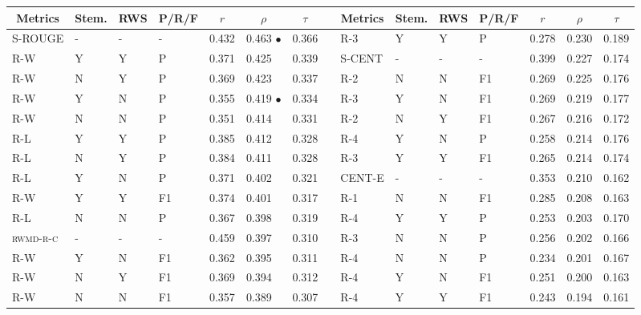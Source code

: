 \documentclass[11pt,a4paper]{article}
\begin{document}
\begin{table}[]
{
\scriptsize
\centering
\begin{tabular}{lllllllllllllll}
\hline
\multicolumn{1}{c}{Metrics} & \multicolumn{1}{c}{Stem.} & \multicolumn{1}{c}{RWS} & \multicolumn{1}{c}{P/R/F} & \multicolumn{1}{c}{$r$} & \multicolumn{1}{c}{$\rho$} & \multicolumn{1}{c}{$\tau$} & \multicolumn{1}{c}{} & \multicolumn{1}{c}{Metrics} & \multicolumn{1}{c}{Stem.} & \multicolumn{1}{c}{RWS} & \multicolumn{1}{c}{P/R/F} & \multicolumn{1}{c}{$r$} & \multicolumn{1}{c}{$\rho$} & \multicolumn{1}{c}{$\tau$} \\ \hline
\textsc{S-ROUGE} & - & - & - & 0.432 & 0.463 $\bullet$ & 0.366 &  & \textsc{R-3} & Y & Y & P & 0.278 & 0.230 & 0.189 \\
\textsc{R-W} & Y & Y & P & 0.371 & 0.425 & 0.339 &  & \textsc{S-CENT} & - & - & - & 0.399 & 0.227 & 0.174 \\
\textsc{R-W} & N & Y & P & 0.369 & 0.423 & 0.337 &  & \textsc{R-2} & N & N & F1 & 0.269 & 0.225 & 0.176 \\
\textsc{R-W} & Y & N & P & 0.355 & 0.419 $\bullet$ & 0.334 &  & \textsc{R-3} & Y & N & F1 & 0.269 & 0.219 & 0.177 \\
\textsc{R-W} & N & N & P & 0.351 & 0.414 & 0.331 &  & \textsc{R-2} & N & Y & F1 & 0.267 & 0.216 & 0.172 \\
\textsc{R-L} & Y & Y & P & 0.385 & 0.412 & 0.328 &  & \textsc{R-4} & Y & N & P & 0.258 & 0.214 & 0.176 \\
\textsc{R-L} & N & Y & P & 0.384 & 0.411 & 0.328 &  & \textsc{R-3} & Y & Y & F1 & 0.265 & 0.214 & 0.174 \\
\textsc{R-L} & Y & N & P & 0.371 & 0.402 & 0.321 &  & \textsc{CENT-E} & - & - & - & 0.353 & 0.210 & 0.162 \\
\textsc{R-W} & Y & Y & F1 & 0.374 & 0.401 & 0.317 &  & \textsc{R-1} & N & N & F1 & 0.285 & 0.208 & 0.163 \\
\textsc{R-L} & N & N & P & 0.367 & 0.398 & 0.319 &  & \textsc{R-4} & Y & Y & P & 0.253 & 0.203 & 0.170 \\
\textsc{rwmd-r-c} & - & - & - & 0.459 & 0.397 & 0.310 &  & \textsc{R-3} & N & N & P & 0.256 & 0.202 & 0.166 \\
\textsc{R-W} & Y & N & F1 & 0.362 & 0.395 & 0.311 &  & \textsc{R-4} & N & N & P & 0.234 & 0.201 & 0.167 \\
\textsc{R-W} & N & Y & F1 & 0.369 & 0.394 & 0.312 &  & \textsc{R-4} & Y & N & F1 & 0.251 & 0.200 & 0.163 \\
\textsc{R-W} & N & N & F1 & 0.357 & 0.389 & 0.307 &  & \textsc{R-4} & Y & Y & F1 & 0.243 & 0.194 & 0.161 \\

\end{tabular}}
\end{table}
\end{document}
